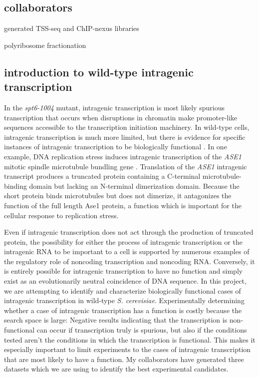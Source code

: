 \documentclass[9pt, letterpaper]{article}
\begin{document}
\subsection{collaborators}

\begin{description}[align=right, labelwidth=5cm, noitemsep]
    \item [Steve Doris] generated TSS-seq and ChIP-nexus libraries
    \item [Dan Spatt] polyribosome fractionation
\end{description}

\subsection{introduction to wild-type intragenic transcription}

In the \textit{spt6-1004} mutant, intragenic transcription is most likely spurious transcription that occurs when disruptions in chromatin make promoter-like sequences accessible to the transcription initiation machinery. In wild-type cells, intragenic transcription is much more limited, but there is evidence for specific instances of intragenic transcription to be biologically functional \cite{mcknight2014, gammie1999}. In one example, DNA replication stress induces intragenic transcription of the \textit{ASE1} mitotic spindle microtubule bundling gene \cite{mcknight2014}. Translation of the \textit{ASE1} intragenic transcript produces a truncated protein containing a C-terminal microtubule-binding domain but lacking an N-terminal dimerization domain. Because the short protein binds microtubules but does not dimerize, it antagonizes the function of the full length Ase1 protein, a function which is important for the cellular response to replication stress.

Even if intragenic transcription does not act through the production of truncated protein, the possibility for either the process of intragenic transcription or the intragenic RNA to be important to a cell is supported by numerous examples of the regulatory role of noncoding transcription and noncoding RNA. Conversely, it is entirely possible for intragenic transcription to have no function and simply exist as an evolutionarily neutral coincidence of DNA sequence. In this project, we are attempting to identify and characterize biologically functional cases of intragenic transcription in wild-type \textit{S. cerevisiae}. Experimentally determining whether a case of intragenic transcription has a function is costly because the search space is large: Negative results indicating that the transcription is non-functional can occur if transcription truly is spurious, but also if the conditions tested aren't the conditions in which the transcription is functional. This makes it especially important to limit experiments to the cases of intragenic transcription that are most likely to have a function. My collaborators have generated three datasets which we are using to identify the best experimental candidates.
\end{document}
